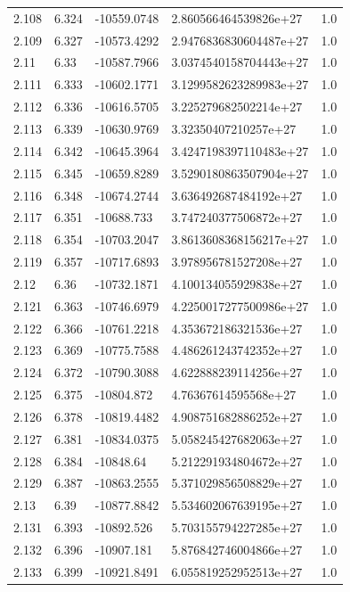 \begin{tabular}{lllll}
2.108 & 6.324 & -10559.0748 & 2.860566464539826e+27 & 1.0 \\
2.109 & 6.327 & -10573.4292 & 2.9476836830604487e+27 & 1.0 \\
2.11 & 6.33 & -10587.7966 & 3.0374540158704443e+27 & 1.0 \\
2.111 & 6.333 & -10602.1771 & 3.1299582623289983e+27 & 1.0 \\
2.112 & 6.336 & -10616.5705 & 3.225279682502214e+27 & 1.0 \\
2.113 & 6.339 & -10630.9769 & 3.32350407210257e+27 & 1.0 \\
2.114 & 6.342 & -10645.3964 & 3.4247198397110483e+27 & 1.0 \\
2.115 & 6.345 & -10659.8289 & 3.5290180863507904e+27 & 1.0 \\
2.116 & 6.348 & -10674.2744 & 3.636492687484192e+27 & 1.0 \\
2.117 & 6.351 & -10688.733 & 3.747240377506872e+27 & 1.0 \\
2.118 & 6.354 & -10703.2047 & 3.8613608368156217e+27 & 1.0 \\
2.119 & 6.357 & -10717.6893 & 3.978956781527208e+27 & 1.0 \\
2.12 & 6.36 & -10732.1871 & 4.100134055929838e+27 & 1.0 \\
2.121 & 6.363 & -10746.6979 & 4.2250017277500986e+27 & 1.0 \\
2.122 & 6.366 & -10761.2218 & 4.353672186321536e+27 & 1.0 \\
2.123 & 6.369 & -10775.7588 & 4.486261243742352e+27 & 1.0 \\
2.124 & 6.372 & -10790.3088 & 4.622888239114256e+27 & 1.0 \\
2.125 & 6.375 & -10804.872 & 4.76367614595568e+27 & 1.0 \\
2.126 & 6.378 & -10819.4482 & 4.908751682886252e+27 & 1.0 \\
2.127 & 6.381 & -10834.0375 & 5.058245427682063e+27 & 1.0 \\
2.128 & 6.384 & -10848.64 & 5.212291934804672e+27 & 1.0 \\
2.129 & 6.387 & -10863.2555 & 5.371029856508829e+27 & 1.0 \\
2.13 & 6.39 & -10877.8842 & 5.534602067639195e+27 & 1.0 \\
2.131 & 6.393 & -10892.526 & 5.703155794227285e+27 & 1.0 \\
2.132 & 6.396 & -10907.181 & 5.876842746004866e+27 & 1.0 \\
2.133 & 6.399 & -10921.8491 & 6.055819252952513e+27 & 1.0 \\

\end{tabular}
